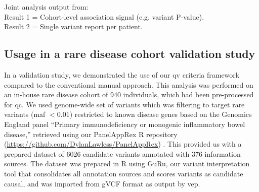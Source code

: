 \begin{tcolorbox}[
    colback=white!0,
    colframe=black,
    boxrule=1pt,
    arc=1mm,
    outer arc=1mm,
    title=\textbf{\refstepcounter{myboxcounter}\label{box:pipe}Box \themyboxcounter: Example diagrammatic representation}
]
\medskip

Joint analysis output from:\\
Result 1 = Cohort-level association signal (e.g. variant P-value).\\
Result 2 = Single variant report per patient.
\end{tcolorbox}

\subsection{Usage in a rare disease cohort validation study}

In a validation study, we demonstrated the use of our \ac{qv} criteria framework 
compared to the conventional manual approach. 
This analysis was performed on an in-house rare disease cohort of 940 individuals, which had been pre-processed for \ac{qc}. %
We used genome-wide set of variants which was filtering to target rare variants (\ac{maf} $< 0.01$) restricted to known disease genes based on the Genomics England panel ``Primary immunodeficiency or monogenic inflammatory bowel disease,'' retrieved using our PanelAppRex R repository (\url{https://github.com/DylanLawless/PanelAppRex}) 
\cite{lawless_panelapprex_2025}. 
This provided us with a prepared dataset of 6026 candidate variants annotated with 376 information sources.
The dataset was prepared in R using GuRu, our variant interpretation tool that consolidates all annotation sources and scores variants as candidate causal, and was imported from gVCF format as output by \ac{vep}.

